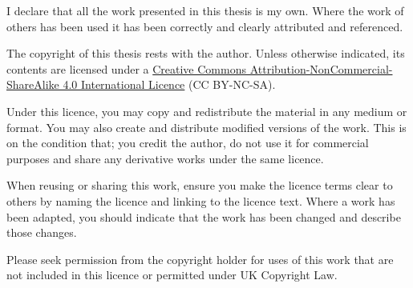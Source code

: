I declare that all the work presented in this thesis is my own. Where the work
of others has been used it has been correctly and clearly attributed and
referenced.

The copyright of this thesis rests with the author. Unless otherwise indicated,
its contents are licensed under a
\href{https://creativecommons.org/licenses/by-nc-sa/4.0/}{Creative Commons
Attribution-NonCommercial-ShareAlike 4.0 International Licence} (CC BY-NC-SA).

Under this licence, you may copy and redistribute the material in any medium or
format. You may also create and distribute modified versions of the work. This
is on the condition that; you credit the author, do not use it for commercial
purposes and share any derivative works under the same licence.

When reusing or sharing this work, ensure you make the licence terms clear to
others by naming the licence and linking to the licence text. Where a work has
been adapted, you should indicate that the work has been changed and describe
those changes.

Please seek permission from the copyright holder for uses of this work that are
not included in this licence or permitted under UK Copyright Law.

